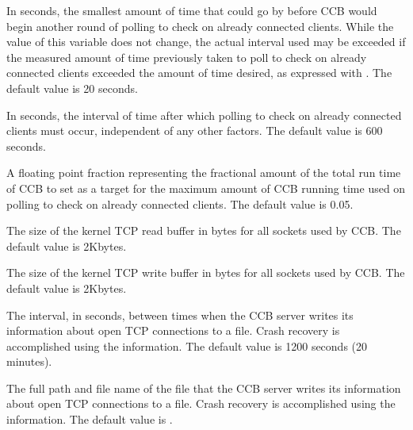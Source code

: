 \begin{description}
\label{param:CcbPollingInterval}
\item[\Macro{CCB\_POLLING\_INTERVAL}] In seconds, the smallest amount 
  of time that could go by before CCB would begin another round of polling to
  check on already connected clients.
  While the value of this variable does not change,
  the actual interval used may be exceeded if the measured amount 
  of time previously taken to poll to check on already connected clients 
  exceeded the amount of time desired, 
  as expressed with . 
  The default value is 20 seconds.

\label{param:CcbPollingMaxInterval}
\item[\Macro{CCB\_POLLING\_MAX\_INTERVAL}] In seconds, the interval of time
  after which polling to check on already connected clients must occur,
  independent of any other factors.
  The default value is 600 seconds.

\label{param:CcbPollingTimeslice}
\item[\Macro{CCB\_POLLING\_TIMESLICE}] A floating point fraction
  representing the fractional amount of the total run time of CCB
  to set as a target for the maximum amount of CCB running time used on 
  polling to check on already connected clients.
  The default value is 0.05.

\label{param:CcbReadBuffer}
\item[\Macro{CCB\_READ\_BUFFER}] The size of the kernel TCP read buffer 
  in bytes for all sockets used by CCB.
  The default value is 2Kbytes.

\label{param:CcbWriteBuffer}
\item[\Macro{CCB\_WRITE\_BUFFER}] The size of the kernel TCP write buffer 
  in bytes for all sockets used by CCB.
  The default value is 2Kbytes.

\label{param:CcbSweepInterval}
\item[\Macro{CCB\_SWEEP\_INTERVAL}]  The interval, in seconds,
  between times when the CCB server writes its information about 
  open TCP connections to a file. 
  Crash recovery is accomplished using the information.
  The default value is 1200 seconds (20 minutes).

\label{param:CcbReconnectFile}
\item[\Macro{CCB\_RECONNECT\_FILE}] The full path and file name of the
  file that the CCB server writes its information about 
  open TCP connections to a file.
  Crash recovery is accomplished using the information.
  The default value is .


\end{description}
